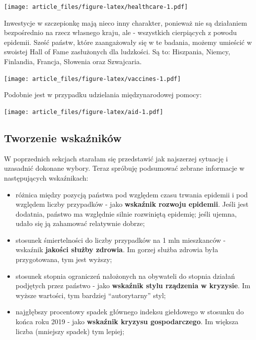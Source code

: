 \documentclass[
]{article}
\providecommand{\tightlist}{%
  \setlength{\itemsep}{0pt}\setlength{\parskip}{0pt}}
\begin{document}
\texttt{[image: article\_files/figure-latex/healthcare-1.pdf]}

Inwestycje w szczepionkę mają nieco inny charakter, ponieważ nie są
działaniem bezpośrednio na rzecz własnego kraju, ale - wszystkich
cierpiących z powodu epidemii. Sześć państw, które zaangażowały się w te
badania, możemy umieścić w swoistej Hall of Fame zasłużonych dla
ludzkości. Są to: Hiszpania, Niemcy, Finlandia, Francja, Słowenia oraz
Szwajcaria.

\texttt{[image: article\_files/figure-latex/vaccines-1.pdf]}

Podobnie jest w przypadku udzielania międzynarodowej pomocy:

\texttt{[image: article\_files/figure-latex/aid-1.pdf]}

\hypertarget{tworzenie-wskaux17anikuxf3w}{%
\subsection{Tworzenie wskaźników}\label{tworzenie-wskaux17anikuxf3w}}

W poprzednich sekcjach starałam się przedstawić jak najszerzej sytuację
i uzasadnić dokonane wybory. Teraz spróbuję podsumować zebrane
informacje w następujących wskaźnikach:

\begin{itemize}
\tightlist
\item
  różnica między pozycją państwa pod względem czasu trwania epidemii i
  pod względem liczby przypadków - jako \textbf{wskaźnik rozwoju
  epidemii}. Jeśli jest dodatnia, państwo ma względnie silnie rozwiniętą
  epidemię; jeśli ujemna, udało się ją zahamować relatywnie dobrze;
\item
  stosunek śmiertelności do liczby przypadków na 1 mln mieszkanców -
  wskaźnik \textbf{jakości służby zdrowia}. Im gorzej służba zdrowia
  była przygotowana, tym jest wyższy;
\item
  stosunek stopnia ograniczeń nałożonych na obywateli do stopnia działań
  podjętych przez państwo - jako \textbf{wskaźnik stylu rządzenia w
  kryzysie}. Im wyższe wartości, tym bardziej ``autorytarny'' styl;
\item
  najgłębszy procentowy spadek głównego indeksu giełdowego w stosunku do
  końca roku 2019 - jako \textbf{wskaźnik kryzysu gospodarczego}. Im
  większa liczba (mniejszy spadek) tym lepiej;
\end{itemize}
\end{document}

